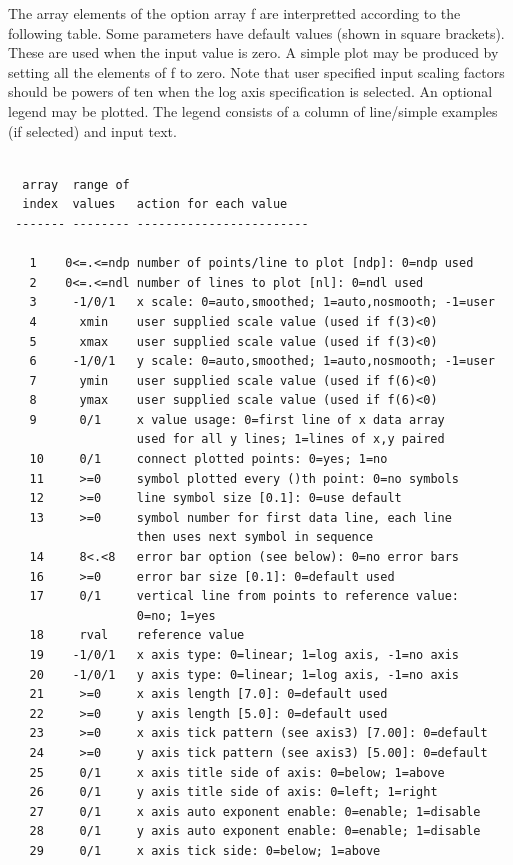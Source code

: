 \documentclass[11pt]{report}
\begin{document}
The array elements of the option array f are interpretted according
to the following table.  Some parameters have default values (shown
in square brackets).  These are used when the input value is zero.
A simple plot may be produced by setting all the elements of f to
zero.  Note that user specified input scaling factors should be
powers of ten when the log axis specification is selected.  An optional
legend may be plotted.  The legend consists of a column
of line/simple examples (if selected) and input text.
\begin{verbatim}

  array  range of
  index  values   action for each value
 ------- -------- ------------------------

   1    0<=.<=ndp number of points/line to plot [ndp]: 0=ndp used
   2    0<=.<=ndl number of lines to plot [nl]: 0=ndl used
   3     -1/0/1   x scale: 0=auto,smoothed; 1=auto,nosmooth; -1=user
   4      xmin    user supplied scale value (used if f(3)<0)
   5      xmax    user supplied scale value (used if f(3)<0)
   6     -1/0/1   y scale: 0=auto,smoothed; 1=auto,nosmooth; -1=user
   7      ymin    user supplied scale value (used if f(6)<0)
   8      ymax    user supplied scale value (used if f(6)<0)
   9      0/1     x value usage: 0=first line of x data array
                  used for all y lines; 1=lines of x,y paired
   10     0/1     connect plotted points: 0=yes; 1=no
   11     >=0     symbol plotted every ()th point: 0=no symbols
   12     >=0     line symbol size [0.1]: 0=use default
   13     >=0     symbol number for first data line, each line
                  then uses next symbol in sequence
   14     8<.<8   error bar option (see below): 0=no error bars
   16     >=0     error bar size [0.1]: 0=default used
   17     0/1     vertical line from points to reference value:
                  0=no; 1=yes
   18     rval    reference value
   19    -1/0/1   x axis type: 0=linear; 1=log axis, -1=no axis
   20    -1/0/1   y axis type: 0=linear; 1=log axis, -1=no axis
   21     >=0     x axis length [7.0]: 0=default used
   22     >=0     y axis length [5.0]: 0=default used
   23     >=0     x axis tick pattern (see axis3) [7.00]: 0=default
   24     >=0     y axis tick pattern (see axis3) [5.00]: 0=default
   25     0/1     x axis title side of axis: 0=below; 1=above
   26     0/1     y axis title side of axis: 0=left; 1=right
   27     0/1     x axis auto exponent enable: 0=enable; 1=disable
   28     0/1     y axis auto exponent enable: 0=enable; 1=disable
   29     0/1     x axis tick side: 0=below; 1=above

\end{verbatim}
\end{document}
